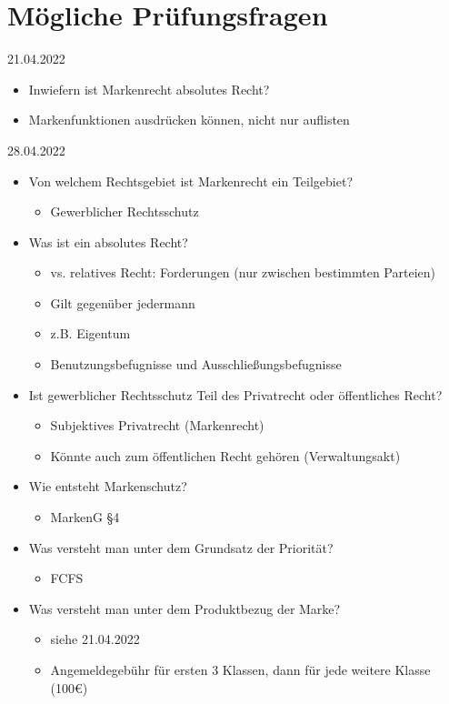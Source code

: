 \documentclass{report}
\begin{document}
\section{Mögliche Prüfungsfragen}
21.04.2022
\begin{itemize}
	\item Inwiefern ist Markenrecht absolutes Recht?
	\item Markenfunktionen ausdrücken können, nicht nur auflisten
\end{itemize}
28.04.2022
\begin{itemize}
	\item Von welchem Rechtsgebiet ist Markenrecht ein Teilgebiet?
	\begin{itemize}
		\item Gewerblicher Rechtsschutz
	\end{itemize}
	\item Was ist ein absolutes Recht?
	\begin{itemize}
		\item vs. relatives Recht: Forderungen (nur zwischen bestimmten Parteien)
		\item Gilt gegenüber jedermann
		\item z.B. Eigentum
		\item Benutzungsbefugnisse und Ausschließungsbefugnisse
	\end{itemize}
	\item Ist gewerblicher Rechtsschutz Teil des Privatrecht oder öffentliches Recht?
	\begin{itemize}
		\item Subjektives Privatrecht (Markenrecht)
		\item Könnte auch zum öffentlichen Recht gehören (Verwaltungsakt)
	\end{itemize}
	\item Wie entsteht Markenschutz?
	\begin{itemize}
		\item MarkenG §4
	\end{itemize}
	\item Was versteht man unter dem Grundsatz der Priorität?
	\begin{itemize}
		\item FCFS
	\end{itemize}
	\item Was versteht man unter dem Produktbezug der Marke?
	\begin{itemize}
		\item siehe 21.04.2022
		\item Angemeldegebühr für ersten 3 Klassen, dann für jede weitere Klasse (100€)
	\end{itemize}
\end{itemize}
\newpage
\end{document}
